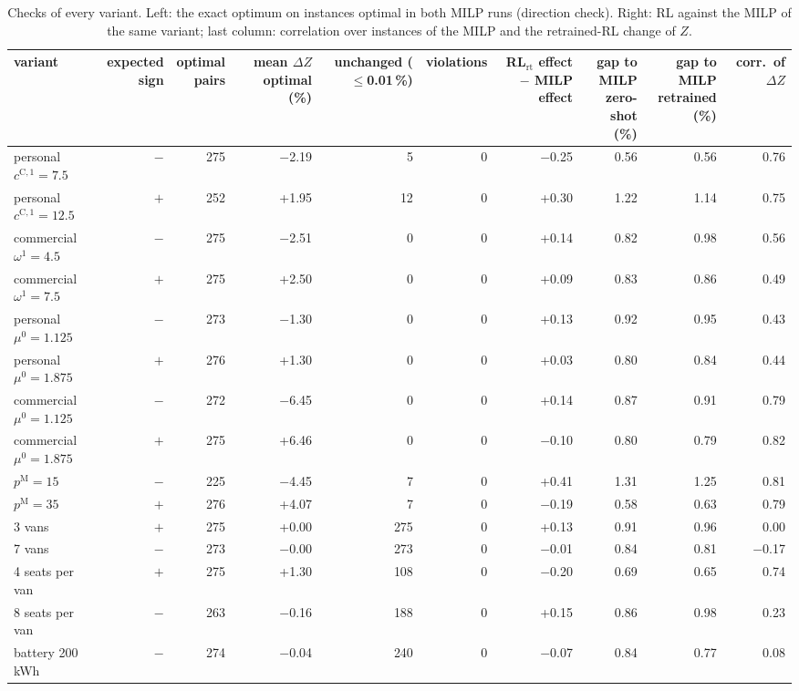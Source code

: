 \begin{table}[H]\centering
\scriptsize
\caption{Checks of every variant. Left: the exact optimum on instances optimal in both MILP runs (direction check). Right: RL against the MILP of the same variant; last column: correlation over instances of the MILP and the retrained-RL change of $Z$.}\label{tab:direction}
\begin{adjustbox}{max width=\textwidth}\begin{tabular}{lrrrrrrrrr}\toprule
variant & \shortstack{expected\\sign} & \shortstack{optimal\\pairs} & \shortstack{mean $\Delta Z$\\optimal (\%)} & \shortstack{unchanged\\($\le$0.01\,\%)} & violations & \shortstack{RL$_{\mathrm{rt}}$ effect\\$-$ MILP effect} & \shortstack{gap to MILP\\zero-shot (\%)} & \shortstack{gap to MILP\\retrained (\%)} & \shortstack{corr.\ of\\$\Delta Z$} \\ \midrule
personal $c^{\mathrm C,1}=7.5$ & $-$ & 275 & $-$2.19 & 5 & 0 & $-$0.25 & 0.56 & 0.56 & 0.76 \\
personal $c^{\mathrm C,1}=12.5$ & $+$ & 252 & +1.95 & 12 & 0 & +0.30 & 1.22 & 1.14 & 0.75 \\
commercial $\omega^{1}=4.5$ & $-$ & 275 & $-$2.51 & 0 & 0 & +0.14 & 0.82 & 0.98 & 0.56 \\
commercial $\omega^{1}=7.5$ & $+$ & 275 & +2.50 & 0 & 0 & +0.09 & 0.83 & 0.86 & 0.49 \\
personal $\mu^{0}=1.125$ & $-$ & 273 & $-$1.30 & 0 & 0 & +0.13 & 0.92 & 0.95 & 0.43 \\
personal $\mu^{0}=1.875$ & $+$ & 276 & +1.30 & 0 & 0 & +0.03 & 0.80 & 0.84 & 0.44 \\
commercial $\mu^{0}=1.125$ & $-$ & 272 & $-$6.45 & 0 & 0 & +0.14 & 0.87 & 0.91 & 0.79 \\
commercial $\mu^{0}=1.875$ & $+$ & 275 & +6.46 & 0 & 0 & $-$0.10 & 0.80 & 0.79 & 0.82 \\
$p^{\mathrm M}=15$ & $-$ & 225 & $-$4.45 & 7 & 0 & +0.41 & 1.31 & 1.25 & 0.81 \\
$p^{\mathrm M}=35$ & $+$ & 276 & +4.07 & 7 & 0 & $-$0.19 & 0.58 & 0.63 & 0.79 \\
3 vans & $+$ & 275 & +0.00 & 275 & 0 & +0.13 & 0.91 & 0.96 & 0.00 \\
7 vans & $-$ & 273 & $-$0.00 & 273 & 0 & $-$0.01 & 0.84 & 0.81 & $-$0.17 \\
4 seats per van & $+$ & 275 & +1.30 & 108 & 0 & $-$0.20 & 0.69 & 0.65 & 0.74 \\
8 seats per van & $-$ & 263 & $-$0.16 & 188 & 0 & +0.15 & 0.86 & 0.98 & 0.23 \\
battery 200 kWh & $-$ & 274 & $-$0.04 & 240 & 0 & $-$0.07 & 0.84 & 0.77 & 0.08 \\
\bottomrule\end{tabular}\end{adjustbox}\end{table}
